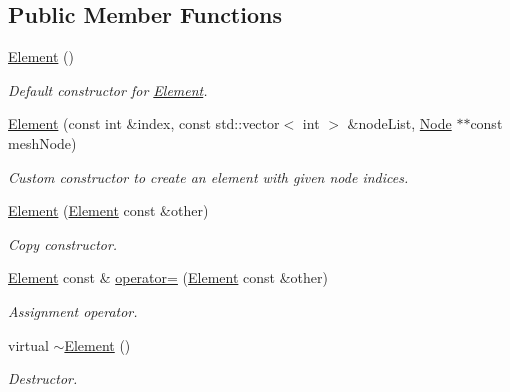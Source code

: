 \subsection*{Public Member Functions}
\begin{DoxyCompactItemize}
\item 
\mbox{\label{class_element_ab0d0e20be9a36ae676202db753faeec9}} 
\mbox{\hyperlink{class_element_ab0d0e20be9a36ae676202db753faeec9}{Element}} ()
\begin{DoxyCompactList}\small\item\em Default constructor for \mbox{\hyperlink{class_element}{Element}}. \end{DoxyCompactList}\item 
\mbox{\hyperlink{class_element_a05c744ed2de597b38da74c7765f5ed1b}{Element}} (const int \&index, const std\+::vector$<$ int $>$ \&node\+List, \mbox{\hyperlink{class_node}{Node}} $\ast$$\ast$const mesh\+Node)
\begin{DoxyCompactList}\small\item\em Custom constructor to create an element with given node indices. \end{DoxyCompactList}\item 
\mbox{\label{class_element_a68700ab3d0e5551cb456e91c3a8fc61b}} 
\mbox{\hyperlink{class_element_a68700ab3d0e5551cb456e91c3a8fc61b}{Element}} (\mbox{\hyperlink{class_element}{Element}} const \&other)
\begin{DoxyCompactList}\small\item\em Copy constructor. \end{DoxyCompactList}\item 
\mbox{\label{class_element_a2baffaa8af3b584a906206d0381cd204}} 
\mbox{\hyperlink{class_element}{Element}} const  \& \mbox{\hyperlink{class_element_a2baffaa8af3b584a906206d0381cd204}{operator=}} (\mbox{\hyperlink{class_element}{Element}} const \&other)
\begin{DoxyCompactList}\small\item\em Assignment operator. \end{DoxyCompactList}\item 
virtual \mbox{\hyperlink{class_element_a13d54ba9c08b6bec651402f1c2bb002c}{$\sim$\+Element}} ()
\begin{DoxyCompactList}\small\item\em Destructor. \end{DoxyCompactList}\item 
$$
\end{DoxyCompactItemize}
